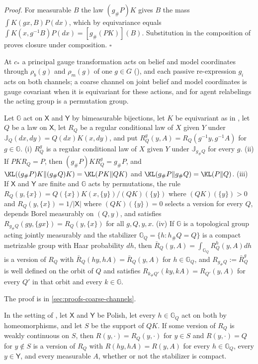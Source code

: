\noindent\emph{Proof.}
For measurable $B$ the law $(g_\#P)K$ gives $B$ the mass $\int K(gx,B)P(dx)$, which by
equivariance equals $\int K(x,g^{-1}B)P(dx)=[g_\#(PK)](B)$. Substitution in the composition of
 proves closure under composition. $\square$

At $c_*$ a principal gauge transformation acts on belief and model coordinates through $\rho_b(g)$
and $\rho_m(g)$ of one $g\in G$ (), and each passive
re-expression $g_i$ acts on both channels; a coarse channel on joint belief and model coordinates is
gauge covariant when it is equivariant for these actions, and for agent relabelings the acting group
is a permutation group.

\label{eq:cg-bayes-version-transport}
\label{eq:cg-finite-equivariant-bayes}
\label{eq:cg-haar-averaged-bayes}
Let $\mathbb G$ act on $\mathsf X$ and $\mathsf Y$ by bimeasurable bijections, let $K$ be
equivariant as in , let $Q$ be a law on $\mathsf X$, let $R_Q$ be a regular
conditional law of $X$ given $Y$ under $\mathbb J_Q(dx,dy)=Q(dx)K(x,dy)$, and put
$R_Q^g(y,A)=R_Q(g^{-1}y,g^{-1}A)$ for $g\in\mathbb G$. (i) $R_Q^g$ is a regular conditional law of
$X$ given $Y$ under $\mathbb J_{g_\#Q}$ for every $g$. (ii) If $PKR_Q=P$, then
$(g_\#P)KR_Q^g=g_\#P$, and $\KL((g_\#P)K\Vert(g_\#Q)K)=\KL(PK\Vert QK)$ and
$\KL(g_\#P\Vert g_\#Q)=\KL(P\Vert Q)$. (iii) If $\mathsf X$ and $\mathsf Y$ are finite and
$\mathbb G$ acts by permutations, the rule $R_Q(y,\{x\})=Q(\{x\})K(x,\{y\})/(QK)(\{y\})$ where
$(QK)(\{y\})>0$ and $R_Q(y,\{x\})=1/\lvert\mathsf X\rvert$ where $(QK)(\{y\})=0$ selects a version
for every $Q$, depends Borel measurably on $(Q,y)$, and satisfies
$R_{g_\#Q}(gy,\{gx\})=R_Q(y,\{x\})$ for all $g,Q,y,x$. (iv) If $\mathbb G$ is a topological group
acting jointly measurably and the stabilizer $\mathbb G_Q=\{h:h_\#Q=Q\}$ is a compact metrizable
group with Haar probability $dh$, then $\bar R_Q(y,A)=\int_{\mathbb G_Q}R_Q^h(y,A)dh$ is a version
of $R_Q$ with $\bar R_Q(hy,hA)=\bar R_Q(y,A)$ for $h\in\mathbb G_Q$, and $R_{g_\#Q}:=\bar R_Q^g$ is
well defined on the orbit of $Q$ and satisfies $R_{k_\#Q'}(ky,kA)=R_{Q'}(y,A)$ for every $Q'$ in
that orbit and every $k\in\mathbb G$. 

The proof is in \cref{sec:proofs-coarse-channels}.

In the setting of , let $\mathsf X$ and $\mathsf Y$ be Polish,
let every $h\in\mathbb G_Q$ act on both by homeomorphisms, and let $S$ be the support of $QK$. If some
version of $R_Q$ is weakly continuous on $S$, then $R(y,\cdot)=R_Q(y,\cdot)$ for $y\in S$ and
$R(y,\cdot)=Q$ for $y\notin S$ is a version of $R_Q$ with $R(hy,hA)=R(y,A)$ for every
$h\in\mathbb G_Q$, every $y\in\mathsf Y$, and every measurable $A$, whether or not the stabilizer is
compact. 

